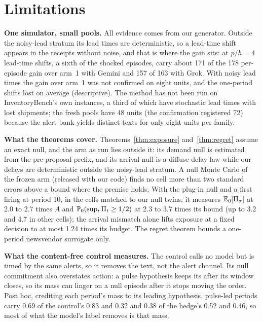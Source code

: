 \section{Limitations}
\label{sec:limitations}

\textbf{One simulator, small pools.} All evidence comes from our generator. Outside the
noisy-lead stratum its lead times are deterministic, so a lead-time shift appears in the receipts
without noise, and that is where the gain sits: at $p/h = 4$ lead-time shifts, a sixth of the shocked episodes, carry
about 171 of the 178 per-episode gain over arm~1 with Gemini and 157 of 163 with Grok. With
noisy lead times the gain over arm~1 was not confirmed on eight units, and the one-period
shifts lost on average (descriptive). The method has not been run on InventoryBench's own instances, a third of
which have stochastic lead times with lost shipments; the fresh pools have 48 units (the confirmation
registered 72) because the alert bank yields distinct texts for only eight units per family.

\textbf{What the theorems cover.} Theorems~\ref{thm:exposure}
and~\ref{thm:regret} assume an exact null, and the arm as run lies outside it: its
demand null is estimated from the pre-proposal prefix, and its arrival null is a
diffuse delay law while our delays are deterministic outside the noisy-lead stratum.
A null Monte Carlo of the frozen arm (released with our code) finds no cell more
than two standard errors above a bound where the premise holds. With the plug-in
null and a first firing at period 10, in the cells matched to our null twins, it
measures $\mathbb{E}_0[\Pi_\sigma]$ at 2.0 to 2.7 times $A$ and
$\mathbb{P}_0(\sup_t \Pi_t \ge 1/2)$ at 2.3 to 3.7 times its bound (up to 3.2 and 4.7
in other cells); the arrival mismatch alone lifts exposure at a fixed decision to
at most 1.24 times its budget. The regret theorem bounds a one-period newsvendor
surrogate only.

\textbf{What the content-free control measures.} The control calls no model but
is timed by the same alerts, so it removes the text, not the alert channel. Its
null commitment also overstates action: a pulse hypothesis keeps its \eprocess{}
after its window closes, so its mass can linger on a null episode after it stops
moving the order. Post hoc, crediting each period's mass to its leading hypothesis,
pulse-led periods carry 0.69 of the control's 0.83 and 0.32 and 0.38 of the hedge's 0.52
and 0.46, so most of what the model's label removes is that mass.

